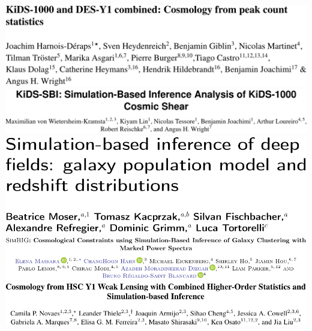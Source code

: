 \documentclass[aspectratio=169]{beamer}
\begin{document}
\begin{frame}
\begin{columns}
        \includegraphics[width=\textwidth]{figures/sbi_papers/kidsdes.pdf}
        \vspace{0pt}\\
        \includegraphics[width=\textwidth]{figures/sbi_papers/kids.pdf}
        \vspace{0pt}\\
        \includegraphics[width=\textwidth]{figures/sbi_papers/population.pdf}
        \vspace{0pt}\\
        \includegraphics[width=\textwidth]{figures/sbi_papers/simbig.pdf}
        \vspace{0pt}\\
        \includegraphics[width=\textwidth]{figures/sbi_papers/hsc.pdf}
    \end{columns}
\end{frame}
\end{document}
